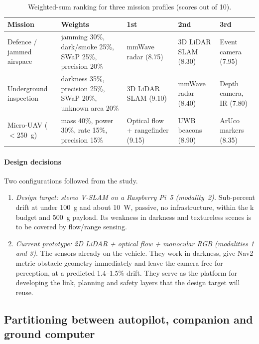 \begin{table}[H]
\centering\small
\caption{Weighted-sum ranking for three mission profiles (scores out of 10).}
\label{tab:mcda}
\begin{tabularx}{\textwidth}{p{2.5cm} L p{2.3cm} p{2.3cm} p{2.3cm}}
\toprule
\textbf{Mission} & \textbf{Weights} & \textbf{1st} & \textbf{2nd} & \textbf{3rd} \\
\midrule
Defence / jammed airspace & jamming 30\%, dark/smoke 25\%, SWaP 25\%, precision 20\% & mmWave radar (8.75) & 3D LiDAR SLAM (8.30) & Event camera (7.95) \\
Underground inspection & darkness 35\%, precision 25\%, SWaP 20\%, unknown area 20\% & 3D LiDAR SLAM (9.10) & mmWave radar (8.40) & Depth camera, IR (7.80) \\
Micro-UAV ($<$\SI{250}{\gram}) & mass 40\%, power 30\%, rate 15\%, precision 15\% & Optical flow + rangefinder (9.15) & UWB beacons (8.90) & ArUco markers (8.35) \\
\bottomrule
\end{tabularx}
\end{table}

\paragraph{Design decisions} Two configurations followed from the study.
\begin{enumerate}[leftmargin=*,itemsep=1pt]
  \item \emph{Design target: stereo V-SLAM on a Raspberry Pi~5 (modality~2).}
    Sub-percent drift at under \SI{100}{\gram} and about \SI{10}{\watt}, passive, no
    infrastructure, within the k budget and \SI{500}{\gram} payload. Its
    weakness in darkness and textureless scenes is to be covered by flow/range sensing.
  \item \emph{Current prototype: 2D LiDAR + optical flow + monocular RGB (modalities
    1 and 3).} The sensors already on the vehicle. They work in darkness, give Nav2
    metric obstacle geometry immediately and leave the camera free for perception, at a
    predicted 1.4--1.5\% drift. They serve as the platform for developing the link,
    planning and safety layers that the design target will reuse.
\end{enumerate}

\subsection{Partitioning between autopilot, companion and ground computer}

